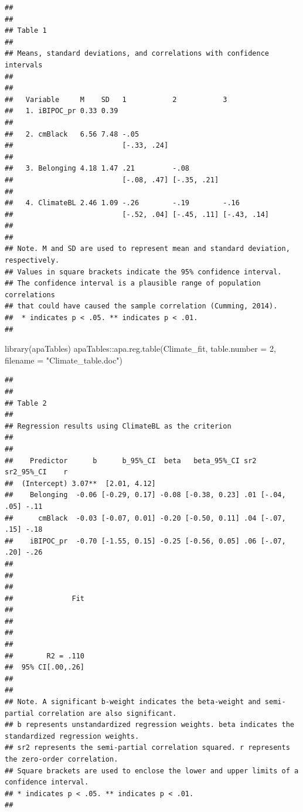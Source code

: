 \documentclass[
]{book}
\newenvironment{Shaded}{\begin{snugshade}}{\end{snugshade}}
\newcommand{\AttributeTok}[1]{\textcolor[rgb]{0.77,0.63,0.00}{#1}}
\newcommand{\DecValTok}[1]{\textcolor[rgb]{0.00,0.00,0.81}{#1}}
\newcommand{\FunctionTok}[1]{\textcolor[rgb]{0.00,0.00,0.00}{#1}}
\newcommand{\NormalTok}[1]{#1}
\newcommand{\SpecialCharTok}[1]{\textcolor[rgb]{0.00,0.00,0.00}{#1}}
\newcommand{\StringTok}[1]{\textcolor[rgb]{0.31,0.60,0.02}{#1}}
\begin{document}
\begin{verbatim}
## 
## 
## Table 1 
## 
## Means, standard deviations, and correlations with confidence intervals
##  
## 
##   Variable     M    SD   1           2           3          
##   1. iBIPOC_pr 0.33 0.39                                    
##                                                             
##   2. cmBlack   6.56 7.48 -.05                               
##                          [-.33, .24]                        
##                                                             
##   3. Belonging 4.18 1.47 .21         -.08                   
##                          [-.08, .47] [-.35, .21]            
##                                                             
##   4. ClimateBL 2.46 1.09 -.26        -.19        -.16       
##                          [-.52, .04] [-.45, .11] [-.43, .14]
##                                                             
## 
## Note. M and SD are used to represent mean and standard deviation, respectively.
## Values in square brackets indicate the 95% confidence interval.
## The confidence interval is a plausible range of population correlations 
## that could have caused the sample correlation (Cumming, 2014).
##  * indicates p < .05. ** indicates p < .01.
## 
\end{verbatim}

\begin{Shaded}
\begin{Highlighting}[]
\FunctionTok{library}\NormalTok{(apaTables)}
\NormalTok{apaTables}\SpecialCharTok{::}\FunctionTok{apa.reg.table}\NormalTok{(Climate\_fit, }\AttributeTok{table.number =} \DecValTok{2}\NormalTok{, }\AttributeTok{filename =} \StringTok{"Climate\_table.doc"}\NormalTok{)}
\end{Highlighting}
\end{Shaded}

\begin{verbatim}
## 
## 
## Table 2 
## 
## Regression results using ClimateBL as the criterion
##  
## 
##    Predictor      b      b_95%_CI  beta   beta_95%_CI sr2  sr2_95%_CI    r
##  (Intercept) 3.07**  [2.01, 4.12]                                         
##    Belonging  -0.06 [-0.29, 0.17] -0.08 [-0.38, 0.23] .01 [-.04, .05] -.11
##      cmBlack  -0.03 [-0.07, 0.01] -0.20 [-0.50, 0.11] .04 [-.07, .15] -.18
##    iBIPOC_pr  -0.70 [-1.55, 0.15] -0.25 [-0.56, 0.05] .06 [-.07, .20] -.26
##                                                                           
##                                                                           
##                                                                           
##              Fit
##                 
##                 
##                 
##                 
##        R2 = .110
##  95% CI[.00,.26]
##                 
## 
## Note. A significant b-weight indicates the beta-weight and semi-partial correlation are also significant.
## b represents unstandardized regression weights. beta indicates the standardized regression weights. 
## sr2 represents the semi-partial correlation squared. r represents the zero-order correlation.
## Square brackets are used to enclose the lower and upper limits of a confidence interval.
## * indicates p < .05. ** indicates p < .01.
## 
\end{verbatim}
\end{document}
